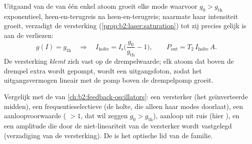\begin{proposition}\label{prop:b2:laser:steady}
Uitgaand van de  van één enkel atoom groeit elke mode waarvoor
$g_0 > g_{\text{th}}$ exponentieel, heen-en-terugreis na heen-en-terugreis;
naarmate haar intensiteit groeit, verzadigt de versterking
(\cref{prop:b2:laser:saturation}) tot zij precies gelijk is aan de verliezen:
\[
g(I) = g_{\text{th}} \quad\Longrightarrow\quad
I_{\text{holte}} = I_{\text{s}}\Big(\frac{g_0}{g_{\text{th}}} - 1\Big),
\qquad P_{\text{out}} = T_2\,I_{\text{holte}}\,A .
\]
De versterking \emph{klemt} zich vast op de drempelwaarde; elk atoom dat
boven de drempel extra wordt gepompt, wordt een uitgangsfoton, zodat het
uitgangsvermogen
lineair met de pomp boven de drempelpomp groeit.
\end{proposition}

\begin{remark}\label{rem:b2:laser:feedback}
Vergelijk met de  van
\cref{ch:b2:feedback-oscillators}: een versterker (het geïnverteerde midden),
een frequentieselectieve  (de holte, die alleen haar modes doorlaat),
een aanloopvoorwaarde ( $> 1$, dat wil zeggen $g_0 > g_{\text{th}}$),
aanloop uit ruis (hier ), en een amplitude die door
de niet-lineariteit van de versterker wordt vastgelegd (verzadiging van de
versterking). De  is
het optische lid van de familie.
\end{remark}

